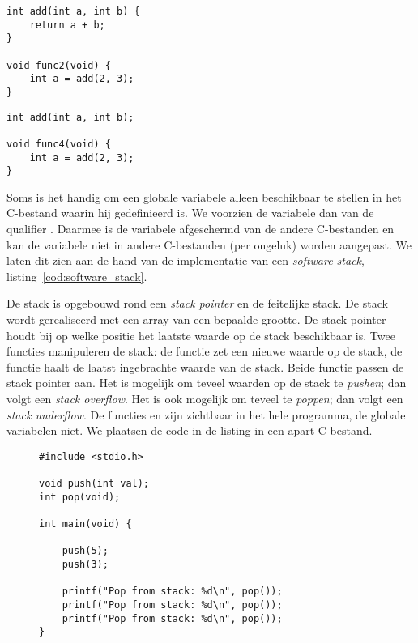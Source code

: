\begin{minipage}[c]{0.45\textwidth}
\begin{lstlisting}[caption=\texttt{file3.c},label=cod:comfile3c]
int add(int a, int b) {
    return a + b;
}

void func2(void) {
    int a = add(2, 3);
}
\end{lstlisting}
\end{minipage}\hfill%
\begin{minipage}[c]{0.45\textwidth}
\begin{lstlisting}[caption=\texttt{file4.c},label=cod:comfile4c]
int add(int a, int b);

void func4(void) {
    int a = add(2, 3);
}
\end{lstlisting}
\end{minipage}

Soms is het handig om een globale variabele alleen beschikbaar te stellen in het C-bestand waarin hij gedefinieerd is. We voorzien de variabele dan van de qualifier . Daarmee is de variabele afgeschermd van de andere C-bestanden en kan de variabele niet in andere C-bestanden (per ongeluk) worden aangepast. We laten dit zien aan de hand van de implementatie van een \textsl{software stack}, listing~\ref{cod:software_stack}.


De stack is opgebouwd rond een \textsl{stack pointer} en de feitelijke stack. De stack wordt gerealiseerd met een array van een bepaalde grootte. De stack pointer houdt bij op welke positie het laatste waarde op de stack beschikbaar is. Twee functies manipuleren de stack: de functie  zet een nieuwe waarde op de stack, de functie  haalt de laatst ingebrachte waarde van de stack. Beide functie passen de stack pointer aan. Het is mogelijk om teveel waarden op de stack te \textsl{pushen}; dan volgt een \textsl{stack overflow}. Het is ook mogelijk om teveel te \textsl{poppen}; dan volgt een \textsl{stack underflow}. De functies  en  zijn zichtbaar in het hele programma, de globale variabelen niet. We plaatsen de code in de listing in een apart C-bestand.

\begin{figure}[!ht]
\begin{lstlisting}[caption=\texttt{file4.c},label=cod:comstackmain]
#include <stdio.h>

void push(int val);
int pop(void);

int main(void) {

	push(5);
	push(3);

	printf("Pop from stack: %d\n", pop());
	printf("Pop from stack: %d\n", pop());
	printf("Pop from stack: %d\n", pop());
}
\end{lstlisting}
\end{figure}

